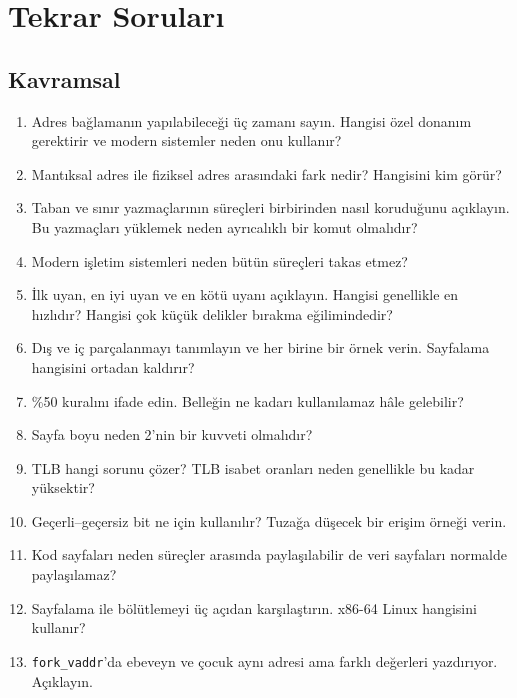 \documentclass[11pt,a4paper]{article}
\newcommand{\cmd}[1]{\texttt{#1}}
\begin{document}
\section{Tekrar Soruları}

\subsection*{Kavramsal}
\begin{enumerate}[leftmargin=1.6em]
  \item Adres bağlamanın yapılabileceği üç zamanı sayın. Hangisi özel donanım gerektirir ve modern sistemler neden onu kullanır?
  \item Mantıksal adres ile fiziksel adres arasındaki fark nedir? Hangisini kim görür?
  \item Taban ve sınır yazmaçlarının süreçleri birbirinden nasıl koruduğunu açıklayın. Bu yazmaçları yüklemek neden ayrıcalıklı bir komut olmalıdır?
  \item Modern işletim sistemleri neden bütün süreçleri takas etmez?
  \item İlk uyan, en iyi uyan ve en kötü uyanı açıklayın. Hangisi genellikle en hızlıdır? Hangisi çok küçük delikler bırakma eğilimindedir?
  \item Dış ve iç parçalanmayı tanımlayın ve her birine bir örnek verin. Sayfalama hangisini ortadan kaldırır?
  \item \%50 kuralını ifade edin. Belleğin ne kadarı kullanılamaz hâle gelebilir?
  \item Sayfa boyu neden 2'nin bir kuvveti olmalıdır?
  \item TLB hangi sorunu çözer? TLB isabet oranları neden genellikle bu kadar yüksektir?
  \item Geçerli--geçersiz bit ne için kullanılır? Tuzağa düşecek bir erişim örneği verin.
  \item Kod sayfaları neden süreçler arasında paylaşılabilir de veri sayfaları normalde paylaşılamaz?
  \item Sayfalama ile bölütlemeyi üç açıdan karşılaştırın. x86-64 Linux hangisini kullanır?
  \item \cmd{fork\_vaddr}'da ebeveyn ve çocuk aynı adresi ama farklı değerleri yazdırıyor. Açıklayın.
\end{enumerate}
\end{document}
